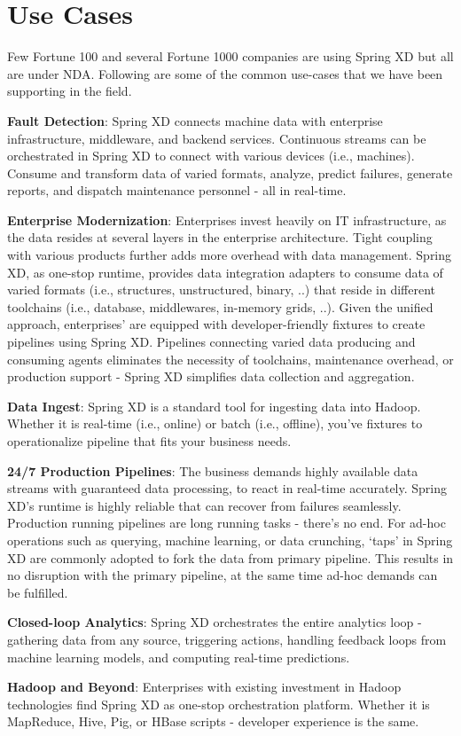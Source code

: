 \section{Use Cases}
Few Fortune 100 and several Fortune 1000 companies are using Spring XD but all are under NDA. Following are some of the common use-cases that we have been supporting in the field.

\begin{itemize*}
\item \textbf{Fault Detection}: Spring XD connects machine data with enterprise infrastructure, middleware, and backend services. Continuous streams can be orchestrated in Spring XD to connect with various devices (i.e., machines). Consume and transform data of varied formats, analyze, predict failures, generate reports, and dispatch maintenance personnel - all in real-time.
\item \textbf{Enterprise Modernization}: Enterprises invest heavily on IT infrastructure, as the data resides at several layers in the enterprise architecture. Tight coupling with various products further adds more overhead with data management. Spring XD, as one-stop runtime, provides data integration adapters to consume data of varied formats (i.e., structures, unstructured, binary, ..) that reside in different toolchains (i.e., database, middlewares, in-memory grids, ..). Given the unified approach, enterprises' are equipped with developer-friendly fixtures to create pipelines using Spring XD. Pipelines connecting varied data producing and consuming agents eliminates the necessity of toolchains, maintenance overhead, or production support - Spring XD simplifies data collection and aggregation.
\item \textbf{Data Ingest}: Spring XD is a standard tool for ingesting data into Hadoop. Whether it is real-time (i.e., online) or batch (i.e., offline), you've fixtures to operationalize pipeline that fits your business needs.
\item \textbf{24/7 Production Pipelines}: The business demands highly available data streams with guaranteed data processing, to react in real-time accurately. Spring XD's runtime is highly reliable that can recover from failures seamlessly. Production running pipelines are long running tasks - there's no end. For ad-hoc operations such as querying, machine learning, or data crunching, `taps' in Spring XD are commonly adopted to fork the data from primary pipeline. This results in no disruption with the primary pipeline, at the same time ad-hoc demands can be fulfilled. 
\item \textbf{Closed-loop Analytics}: Spring XD orchestrates the entire analytics loop - gathering data from any source, triggering actions, handling feedback loops from machine learning models, and computing real-time predictions.
\item \textbf{Hadoop and Beyond}: Enterprises with existing investment in Hadoop technologies find Spring XD as one-stop orchestration platform. Whether it is MapReduce, Hive, Pig, or HBase scripts - developer experience is the same.
\end{itemize*}
